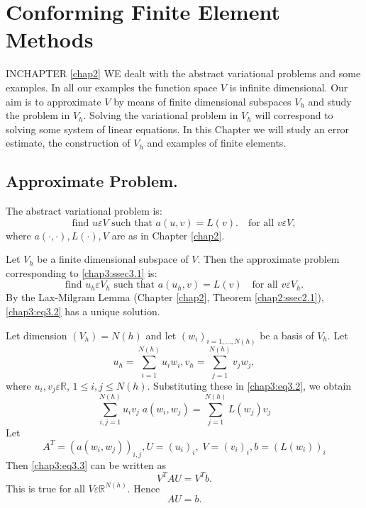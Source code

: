 
\chapter{Conforming Finite Element Methods}\label{chap3}

IN\pageoriginale CHAPTER \ref{chap2} WE dealt with the abstract variational
problems and some examples. In all our examples the function space $V$
is infinite dimensional. Our aim is to approximate $V$ by means of
finite dimensional subspaces $V_h$ and study the problem in
$V_h$. Solving the variational problem in $V_h$ will correspond to
solving some system of linear equations. In this Chapter we will study
an error estimate, the construction of $V_h$ and examples of finite
elements. 

\section{Approximate Problem.}\label{chap3:ssec3.1} The
abstract variational problem is:
\begin{equation}\label{chap3:eq3.1}
\text{find } u\varepsilon V \text{ such that } 
a(u, v)=L(v).\quad\text{for all } v\varepsilon V,
\end{equation}
where $a(\cdotp,\cdotp), L(\cdotp), V$ are as in Chapter \ref{chap2}.

Let $V_h$ be a finite dimensional subspace of $V$. Then the
approximate problem corresponding to \eqref{chap3:ssec3.1} is:
\begin{equation}\label{chap3:eq3.2} 
\text{find } u_h\varepsilon V_h \text{ such that } 
a(u_h, v)=L(v)\quad\text{for all } v\varepsilon V_h.
\end{equation}
By the Lax-Milgram Lemma (Chapter \ref{chap2}, Theorem
\ref{chap2:ssec2.1}), \eqref{chap3:eq3.2} has a unique solution.

Let dimension $(V_h)=N(h)$ and let $(w_i)_{i=1,\ldots,N(h)}$ be a
basis of $V_h$. Let 
$$
u_h=\sum\limits_{i=1}^{N(h)}u_iw_i, v_h= 
\sum\limits_{j=1}^{N(h)}v_j
w_j,
$$\pageoriginale
where $u_i, v_j\varepsilon\mathbb{R}$, $1\leq i, j\leq
N(h)$. Substituting these in \eqref{chap3:eq3.2}, we obtain
\begin{equation}\label{chap3:eq3.3}
\sum\limits_{i,j=1}^{N(h)}u_iv_j\; a(w_i, w_j)=
\sum\limits_{j=1}^{N(h)}L(w_j)v_j
\end{equation}
Let 
$$
A^T=(a(w_i, w_j))_{i,j},U=(u_i)_i,\;V=(v_i)_i,b=(L(w_i))_i
$$
Then \eqref{chap3:eq3.3} can be written as 
$$
V^TAU=V^Tb.
$$
This is true for all $V\varepsilon\mathbb{R}^{N(h)}$. Hence 
\begin{equation}\label{chap3:eq3.4}
AU=b.
\end{equation}

